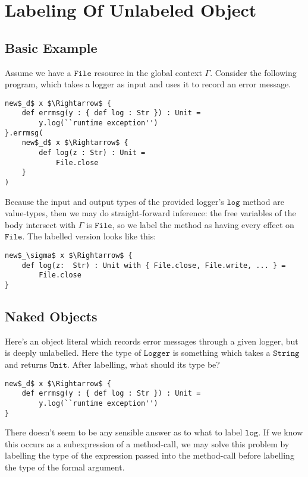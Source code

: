 \documentclass{llncs}
\newcommand{\keywadj}[1]{\mathtt{#1}}
\newcommand{\kwa}[1]{\keywadj{ #1 }}
\begin{document}
\section{Labeling Of Unlabeled Object}

\subsection{Basic Example}

\noindent
Assume we have a $\kwa{File}$ resource in the global context $\Gamma$. Consider the following program, which takes a logger as input and uses it to record an error message.

\begin{lstlisting}
new$_d$ x $\Rightarrow$ {
    def errmsg(y : { def log : Str }) : Unit =
        y.log(``runtime exception'')
}.errmsg(
    new$_d$ x $\Rightarrow$ {
        def log(z : Str) : Unit =
            File.close
    }
)
\end{lstlisting}

\noindent
Because the input and output types of the provided logger's $\kwa{log}$ method are value-types, then we may do straight-forward inference: the free variables of the body intersect with $\Gamma$ is $\kwa{File}$, so we label the method as having every effect on $\kwa{File}$. The labelled version looks like this:

\begin{lstlisting}
new$_\sigma$ x $\Rightarrow$ {
    def log(z:  Str) : Unit with { File.close, File.write, ... } =
        File.close
}
\end{lstlisting}


\subsection{Naked Objects}
 Here's an object literal which records error messages through a given logger, but is deeply unlabelled. Here the type of $\kwa{Logger}$ is something which takes a $\kwa{String}$ and returns $\kwa{Unit}$. After labelling, what should its type be?

\begin{lstlisting}
new$_d$ x $\Rightarrow$ {
    def errmsg(y : { def log : Str }) : Unit =
        y.log(``runtime exception'')
}
\end{lstlisting}

\noindent
There doesn't seem to be any sensible answer as to what to label $\kwa{log}$. If we know this occurs as a subexpression of a method-call, we may solve this problem by labelling the type of the expression passed into the method-call before labelling the type of the formal argument. \\
\end{document}
